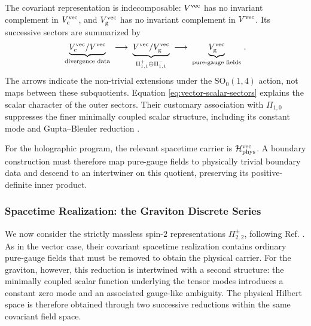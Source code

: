 \documentclass{SciPost}
\begin{document}
The covariant representation is indecomposable: $V^{\rm vec}$ has no invariant complement in $V_{\rm c}^{\rm vec}$, and $V_{\rm g}^{\rm vec}$ has no invariant complement in $V^{\rm vec}$. Its successive sectors are summarized by
\begin{align}
    \underbrace{
        V_{\rm c}^{\rm vec}/V^{\rm vec}
    }_{\text{divergence data}}
    \;\longrightarrow\;
    \underbrace{
        V^{\rm vec}/V_{\rm g}^{\rm vec}
    }_{\Pi_{1,1}^{+}\oplus\Pi_{1,1}^{-}}
    \;\longrightarrow\;
    \underbrace{
        V_{\rm g}^{\rm vec}
    }_{\text{pure-gauge fields}} \,.
\end{align}
The arrows indicate the non-trivial extensions under the $\mathrm{SO}_0(1,4)$ action, not maps between these subquotients. Equation \eqref{eq:vector-scalar-sectors} explains the scalar character of the outer sectors. Their customary association with $\Pi_{1,0}$ suppresses the finer minimally coupled scalar structure, including its constant mode and Gupta--Bleuler reduction \cite{takVec}.

For the holographic program, the relevant spacetime carrier is ${\cal H}_{\rm phys}^{\rm vec}$. A boundary construction must therefore map pure-gauge fields to physically trivial boundary data and descend to an intertwiner on this quotient, preserving its positive-definite inner product.


\subsubsection{Spacetime Realization: the Graviton Discrete Series} \label{sec:graviton-spacetime}

We now consider the strictly massless spin-$2$ representations $\Pi_{2,2}^{\pm}$, following Ref. \cite{GravGB}. As in the vector case, their covariant spacetime realization contains ordinary pure-gauge fields that must be removed to obtain the physical carrier. For the graviton, however, this reduction is intertwined with a second structure: the minimally coupled scalar function underlying the tensor modes introduces a constant zero mode and an associated gauge-like ambiguity. The physical Hilbert space is therefore obtained through two successive reductions within the same covariant field space.
\end{document}
